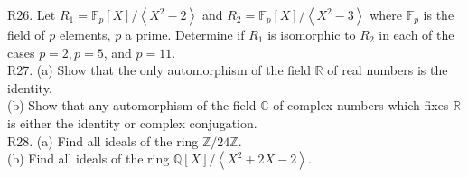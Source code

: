 R26. Let $R_{1}=\mathbb{F}_{p}[X] /\left\langle X^{2}-2\right\rangle$ and $R_{2}=\mathbb{F}_{p}[X] /\left\langle X^{2}-3\right\rangle$ where $\mathbb{F}_{p}$ is the field of $p$ elements, $p$ a prime. Determine if $R_{1}$ is isomorphic to $R_{2}$ in each of the cases $p=2, p=5$, and $p=11$.\\
R27. (a) Show that the only automorphism of the field $\mathbb{R}$ of real numbers is the identity.\\
(b) Show that any automorphism of the field $\mathbb{C}$ of complex numbers which fixes $\mathbb{R}$ is either the identity or complex conjugation.\\
R28. (a) Find all ideals of the ring $\mathbb{Z} / 24 \mathbb{Z}$.\\
(b) Find all ideals of the ring $\mathbb{Q}[X] /\left\langle X^{2}+2 X-2\right\rangle$.


